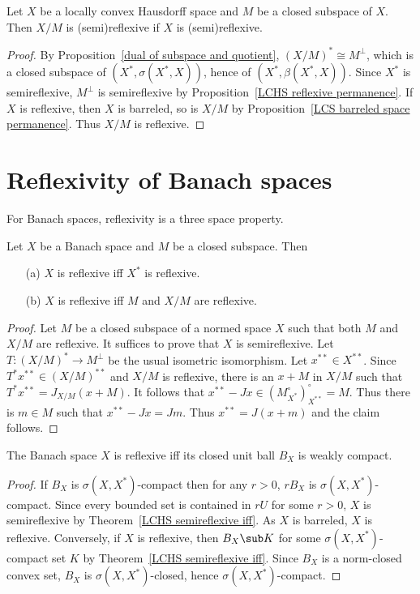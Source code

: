 \begin{corollary}
Let $X$ be a locally convex Hausdorff space and $M$ be a closed subspace of $X$. Then $X/M$ is (semi)reflexive if $X$ is (semi)reflexive.
\end{corollary}
\begin{proof}
By Proposition~\ref{dual of subspace and quotient}, $(X/M)^*\cong M^\bot$, which is a closed subspace of $(X^*,\sigma(X^*,X))$, hence of $(X^*,\beta(X^*,X))$. Since $X^*$ is semireflexive, $M^\bot$ is semireflexive by Proposition~\ref{LCHS reflexive permanence}. If $X$ is reflexive, then $X$ is barreled, so is $X/M$ by Proposition~\ref{LCS barreled space permanence}. Thus $X/M$ is reflexive.
\end{proof}
\section{Reflexivity of Banach spaces}
For Banach spaces, reflexivity is a three space property.
\begin{proposition}\label{Banach space reflexive subspace quotient}
Let $X$ be a Banach space and $M$ be a closed subspace. Then
\begin{itemize}
\item[(a)] $X$ is reflexive iff $X^*$ is reflexive.
\item[(b)] $X$ is reflexive iff $M$ and $X/M$ are reflexive.
\end{itemize}
\end{proposition}
\begin{proof}
Let $M$ be a closed subspace of a normed space $X$ such that both $M$ and $X/M$ are reflexive. It suffices to prove that $X$ is semireflexive. Let $T:(X/M)^*\to M^\bot$ be the usual isometric isomorphism. Let $x^{**}\in X^{**}$. Since $T^*x^{**}\in(X/M)^{**}$ and $X/M$ is reflexive, there is an $x+M$ in $X/M$ such that $T^*x^{**}=J_{X/M}(x+M)$. It follows that $x^{**}-Jx\in (M^\circ_{X^*})^\circ_{X^{**}}=M$. Thus there is $m\in M$ such that $x^{**}-Jx=Jm$. Thus $x^{**}=J(x+m)$ and the claim follows.
\end{proof}
\begin{theorem}\label{Banach space reflexive iff closed unit ball weakly compact}
The Banach space $X$ is reflexive iff its closed unit ball $B_X$ is weakly compact.
\end{theorem}
\begin{proof}
If $B_X$ is $\sigma(X,X^*)$-compact then for any $r>0$, $rB_X$ is $\sigma(X,X^*)$-compact. Since every bounded set is contained in $rU$ for some $r>0$, $X$ is semireflexive by Theorem~\ref{LCHS semireflexive iff}. As $X$ is barreled, $X$ is reflexive. Conversely, if $X$ is reflexive, then $B_X\sub K$ for some $\sigma(X,X^*)$-compact set $K$ by Theorem~\ref{LCHS semireflexive iff}. Since $B_X$ is a norm-closed convex set, $B_X$ is $\sigma(X,X^*)$-closed, hence $\sigma(X,X^*)$-compact.
\end{proof}
